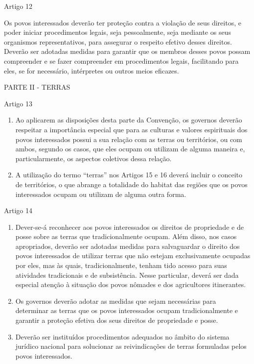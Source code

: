 \documentclass[
]{book}
\begin{document}
Artigo 12

Os povos interessados deverão ter proteção contra a violação de seus direitos, e poder iniciar procedimentos legais, seja pessoalmente, seja mediante os seus organismos representativos, para assegurar o respeito efetivo desses direitos. Deverão ser adotadas medidas para garantir que os membros desses povos possam compreender e se fazer compreender em procedimentos legais, facilitando para eles, se for necessário, intérpretes ou outros meios eficazes.

PARTE II - TERRAS

Artigo 13

\begin{enumerate}
\def\labelenumi{\arabic{enumi}.}
\item
  Ao aplicarem as disposições desta parte da Convenção, os governos deverão respeitar a importância especial que para as culturas e valores espirituais dos povos interessados possui a sua relação com as terras ou territórios, ou com ambos, segundo os casos, que eles ocupam ou utilizam de alguma maneira e, particularmente, os aspectos coletivos dessa relação.
\item
  A utilização do termo ``terras'' nos Artigos 15 e 16 deverá incluir o conceito de territórios, o que abrange a totalidade do habitat das regiões que os povos interessados ocupam ou utilizam de alguma outra forma.
\end{enumerate}

Artigo 14

\begin{enumerate}
\def\labelenumi{\arabic{enumi}.}
\item
  Dever-se-á reconhecer aos povos interessados os direitos de propriedade e de posse sobre as terras que tradicionalmente ocupam. Além disso, nos casos apropriados, deverão ser adotadas medidas para salvaguardar o direito dos povos interessados de utilizar terras que não estejam exclusivamente ocupadas por eles, mas às quais, tradicionalmente, tenham tido acesso para suas atividades tradicionais e de subsistência. Nesse particular, deverá ser dada especial atenção à situação dos povos nômades e dos agricultores itinerantes.
\item
  Os governos deverão adotar as medidas que sejam necessárias para determinar as terras que os povos interessados ocupam tradicionalmente e garantir a proteção efetiva dos seus direitos de propriedade e posse.
\item
  Deverão ser instituídos procedimentos adequados no âmbito do sistema jurídico nacional para solucionar as reivindicações de terras formuladas pelos povos interessados.
\end{enumerate}
\end{document}
